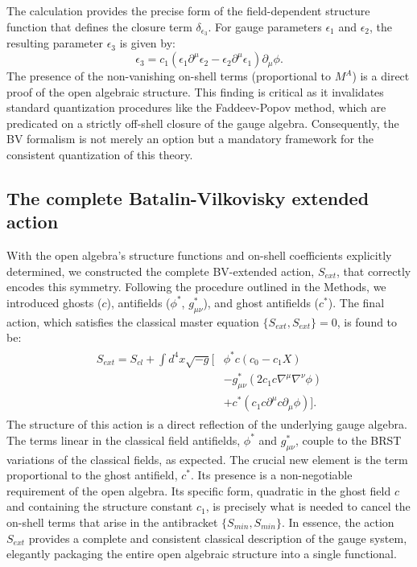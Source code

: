 \documentclass[twocolumn]{aastex631}
\begin{document}
The calculation provides the precise form of the field-dependent structure function that defines the closure term $\delta_{\epsilon_3}$. For gauge parameters $\epsilon_1$ and $\epsilon_2$, the resulting parameter $\epsilon_3$ is given by:
\begin{equation}
    \epsilon_3 = c_1 (\epsilon_1 \partial^\mu \epsilon_2 - \epsilon_2 \partial^\mu \epsilon_1) \partial_\mu \phi.
    \label{eq:structure_function}
\end{equation}
The presence of the non-vanishing on-shell terms (proportional to $M^A$) is a direct proof of the open algebraic structure. This finding is critical as it invalidates standard quantization procedures like the Faddeev-Popov method, which are predicated on a strictly off-shell closure of the gauge algebra. Consequently, the BV formalism is not merely an option but a mandatory framework for the consistent quantization of this theory.

\subsection{The complete Batalin-Vilkovisky extended action}
With the open algebra's structure functions and on-shell coefficients explicitly determined, we constructed the complete BV-extended action, $S_{ext}$, that correctly encodes this symmetry. Following the procedure outlined in the Methods, we introduced ghosts ($c$), antifields ($\phi^*$, $g_{\mu\nu}^*$), and ghost antifields ($c^*$). The final action, which satisfies the classical master equation $\{S_{ext}, S_{ext}\} = 0$, is found to be:
\begin{align}
\begin{split}
    S_{ext} = S_{cl} + \int d^4x \sqrt{-g} \bigg[ &\phi^* c (c_0 - c_1 X) \\
    &- g_{\mu\nu}^* (2 c_1 c \nabla^\mu \nabla^\nu \phi) \\
    &+ c^* (c_1 c \partial^\mu c \partial_\mu \phi) \bigg].
\end{split}
\label{eq:S_ext}
\end{align}
The structure of this action is a direct reflection of the underlying gauge algebra. The terms linear in the classical field antifields, $\phi^*$ and $g_{\mu\nu}^*$, couple to the BRST variations of the classical fields, as expected. The crucial new element is the term proportional to the ghost antifield, $c^*$. Its presence is a non-negotiable requirement of the open algebra. Its specific form, quadratic in the ghost field $c$ and containing the structure constant $c_1$, is precisely what is needed to cancel the on-shell terms that arise in the antibracket $\{S_{min}, S_{min}\}$. In essence, the action $S_{ext}$ provides a complete and consistent classical description of the gauge system, elegantly packaging the entire open algebraic structure into a single functional.
\end{document}
